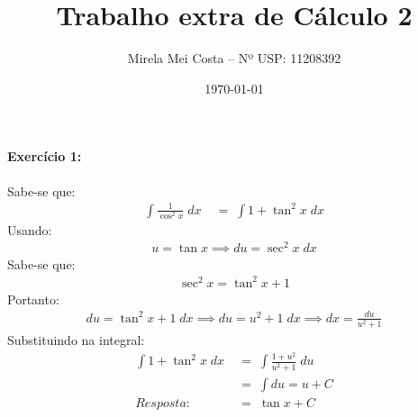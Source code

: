 \documentclass[12pt]{article}
\begin{document}
\title{Trabalho extra de Cálculo 2}
\author{Mirela Mei Costa -- Nº USP: 11208392}
\date{\today}

\maketitle


\paragraph{Exercício 1:}
Sabe-se que:
\begin{align*}
\int \frac{1}{\cos^{2}x}\;dx
&\;=\; \int1 + \tan^{2}x\;dx
\end{align*}
Usando:
\begin{align*}
u = \tan x
\implies du = \sec^{2}x\;dx
\end{align*}
Sabe-se que:
\begin{align*}
\sec^{2}x = \tan^{2}x + 1
\end{align*}
Portanto:
\begin{align*}
du = \tan^{2}x + 1\;dx
\implies du = u^{2} + 1\;dx
\implies dx = \frac{du}{u^{2} + 1}
\end{align*}
Substituindo na integral:
\begin{align*}
\int 1 + \tan^{2}x\;dx
&\;=\; \int \frac{1 + u^{2}}{u^{2} + 1}\;du\\
&\;=\; \int du = u + C\\
Resposta: &\;=\; \tan x + C\\
\end{align*}

\end{document}
